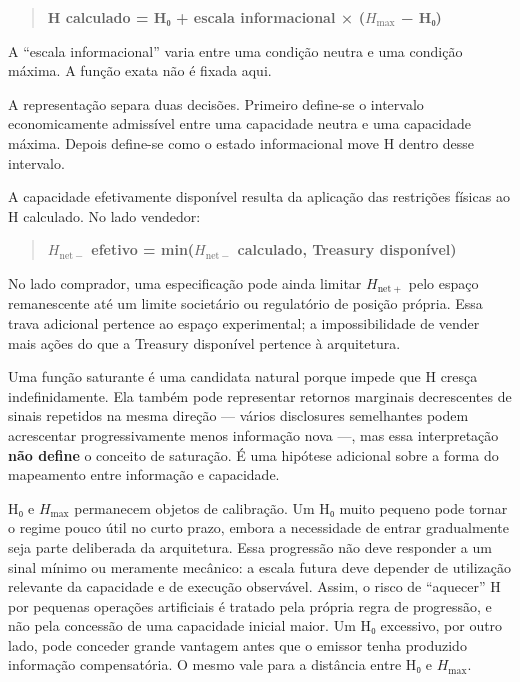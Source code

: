 \documentclass[
  a4paper,
]{article}
\begin{document}
\begin{quote}
\textbf{H calculado = H₀ + escala informacional × (\(H_{\max}\) − H₀)}
\end{quote}

A ``escala informacional'' varia entre uma condição neutra e uma
condição máxima. A função exata não é fixada aqui.

A representação separa duas decisões. Primeiro define-se o intervalo
economicamente admissível entre uma capacidade neutra e uma capacidade
máxima. Depois define-se como o estado informacional move H dentro desse
intervalo.

A capacidade efetivamente disponível resulta da aplicação das restrições
físicas ao H calculado. No lado vendedor:

\begin{quote}
\textbf{\(H_{\mathrm{net}-}\) efetivo = min(\(H_{\mathrm{net}-}\)
calculado, Treasury disponível)}
\end{quote}

No lado comprador, uma especificação pode ainda limitar
\(H_{\mathrm{net}+}\) pelo espaço remanescente até um limite societário
ou regulatório de posição própria. Essa trava adicional pertence ao
espaço experimental; a impossibilidade de vender mais ações do que a
Treasury disponível pertence à arquitetura.

Uma função saturante é uma candidata natural porque impede que H cresça
indefinidamente. Ela também pode representar retornos marginais
decrescentes de sinais repetidos na mesma direção --- vários disclosures
semelhantes podem acrescentar progressivamente menos informação nova
---, mas essa interpretação \textbf{não define} o conceito de saturação.
É uma hipótese adicional sobre a forma do mapeamento entre informação e
capacidade.

H₀ e \(H_{\max}\) permanecem objetos de calibração. Um H₀ muito pequeno
pode tornar o regime pouco útil no curto prazo, embora a necessidade de
entrar gradualmente seja parte deliberada da arquitetura. Essa
progressão não deve responder a um sinal mínimo ou meramente mecânico: a
escala futura deve depender de utilização relevante da capacidade e de
execução observável. Assim, o risco de ``aquecer'' H por pequenas
operações artificiais é tratado pela própria regra de progressão, e não
pela concessão de uma capacidade inicial maior. Um H₀ excessivo, por
outro lado, pode conceder grande vantagem antes que o emissor tenha
produzido informação compensatória. O mesmo vale para a distância entre
H₀ e \(H_{\max}\).
\end{document}
